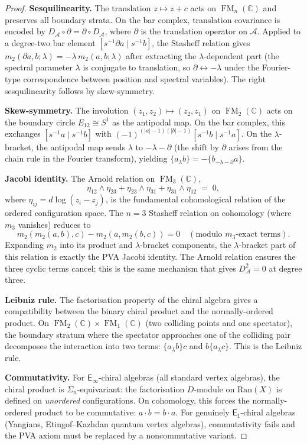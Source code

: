 \documentclass[11pt,reqno]{amsart}
\theoremstyle{definition}
\theoremstyle{remark}
\newcommand{\cA}{\mathcal{A}}
\newcommand{\CC}{\mathbb{C}}
\newcommand{\Ran}{\mathrm{Ran}}
\newcommand{\Eone}{\mathsf{E}_{1}}
\newcommand{\Einf}{\mathsf{E}_{\infty}}
\DeclareMathOperator{\FM}{FM}
\numberwithin{equation}{section}
\begin{document}
\begin{proof}
\textbf{Sesquilinearity.}
The translation $z \mapsto z + c$ acts on $\FM_n(\CC)$ and
preserves all boundary strata.  On the bar complex, translation
covariance is encoded by
$D_\cA \circ \partial = \partial \circ D_\cA$, where $\partial$
is the translation operator on $\cA$.  Applied to a degree-two
bar element $[s^{-1}\partial a \mid s^{-1}b]$, the Stasheff
relation gives
$m_2(\partial a, b; \lambda) = -\lambda\, m_2(a, b; \lambda)$
after extracting the $\lambda$-dependent part (the spectral
parameter $\lambda$ is conjugate to translation, so
$\partial \leftrightarrow -\lambda$ under the Fourier-type
correspondence between position and spectral variables).
The right sesquilinearity follows by skew-symmetry.

\textbf{Skew-symmetry.}
The involution $(z_1, z_2) \mapsto (z_2, z_1)$ on $\FM_2(\CC)$
acts on the boundary circle $E_{12} \cong S^1$ as the antipodal
map.  On the bar complex, this exchanges
$[s^{-1}a \mid s^{-1}b]$ with
$(-1)^{(|a|-1)(|b|-1)}[s^{-1}b \mid s^{-1}a]$.
On the $\lambda$-bracket, the antipodal map sends $\lambda$ to
$-\lambda - \partial$ (the shift by $\partial$ arises from the
chain rule in the Fourier transform), yielding
$\{a_\lambda b\} = -\{b_{-\lambda-\partial} a\}$.

\textbf{Jacobi identity.}
The Arnold relation on $\FM_3(\CC)$,
\begin{equation}\label{eq:arnold-relation}
  \eta_{12} \wedge \eta_{23}
  + \eta_{23} \wedge \eta_{31}
  + \eta_{31} \wedge \eta_{12}
  \;=\; 0,
\end{equation}
where $\eta_{ij} = d\log(z_i - z_j)$, is the fundamental
cohomological relation of the ordered configuration space.
The $n = 3$ Stasheff relation on cohomology (where $m_3$ vanishes)
reduces to
\[
  m_2(m_2(a,b),c) - m_2(a, m_2(b,c)) = 0 \quad (\text{modulo }
  m_3\text{-exact terms}).
\]
Expanding $m_2$ into its product and $\lambda$-bracket components,
the $\lambda$-bracket part of this relation is exactly the
PVA Jacobi identity.  The Arnold relation ensures the three
cyclic terms cancel; this is the same mechanism that gives
$D_\cA^2 = 0$ at degree three.

\textbf{Leibniz rule.}
The factorisation property of the chiral algebra gives a
compatibility between the binary chiral product and the
normally-ordered product.  On $\FM_2(\CC) \times \FM_1(\CC)$
(two colliding points and one spectator), the boundary stratum
where the spectator approaches one of the colliding pair
decomposes the interaction into two terms: $\{a_\lambda b\}c$
and $b\{a_\lambda c\}$.  This is the Leibniz rule.

\textbf{Commutativity.}
For $\Einf$-chiral algebras (all standard vertex algebras), the
chiral product is $\Sigma_n$-equivariant: the factorisation
$D$-module on $\Ran(X)$ is defined on \emph{unordered}
configurations.  On cohomology, this forces the normally-ordered
product to be commutative: $a \cdot b = b \cdot a$.  For
genuinely $\Eone$-chiral algebras (Yangians,
Etingof--Kazhdan quantum vertex algebras), commutativity fails
and the PVA axiom must be replaced by a noncommutative variant.
\end{proof}
\end{document}
